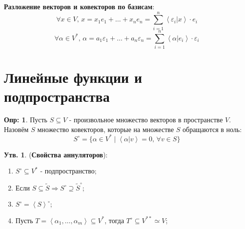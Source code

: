 \documentclass[12pt]{article}
\newcommand{\VE}{\varepsilon}
\theoremstyle{definition}
\newtheorem{defn}{Опр:}
\newtheorem{prop}{Утв.}
\newcommand{\ddsum}[2]{\displaystyle\sum\limits_{#1}^{#2}}
\newcommand{\linsp}[1]{\left\langle #1 \right\rangle }
\newcommand{\linmer}[2]{\left\langle #1 \vert #2\right\rangle }
\newcommand{\wte}[1]{\widetilde{#1}}
\begin{document}
\textbf{Разложение векторов и ковекторов по базисам}:
$$
	\forall x \in V, \, x = x_1 e_1 + \dotsc + x_n e_n = \ddsum{i = 1}{n}\linmer{\VE_i}{x}{\cdot}e_i
$$
$$
	\forall \alpha \in V^*, \, \alpha = a_1 \VE_1 + \dotsc + a_n \VE_n = \ddsum{ i = 1}{n}\linmer{\alpha}{e_i}{\cdot}\VE_i
$$
\newpage
\section*{Линейные функции и подпространства}
\begin{defn}
	Пусть $S \subseteq V$ - произвольное множество векторов в пространстве $V$. Назовём  $S$ множество ковекторов, которые на множестве $S$ обращаются в ноль:
	$$
		S^{\circ} = \{\alpha \in V^* \mid \linmer{\alpha}{v} = 0, \, \forall v \in S\}
	$$
\end{defn}
\begin{prop}(\textbf{Свойства аннуляторов}):
	\begin{enumerate}[label=\arabic*)]
		\item $S^{\circ} \subseteq V^*$ - подпространство;
		\item Если $S \subseteq \wte{S} \Rightarrow S^{\circ} \supseteq \wte{S}^{\circ}$;
		\item $S^{\circ} = \linsp{S}^{\circ}$;
		\item Пусть $T = \linsp{\alpha_1,\dotsc, \alpha_m} \subseteq V^*$, тогда $T^{\circ} \subseteq V^{**} \simeq V$; 
	\end{enumerate}
\end{prop}
\end{document}
